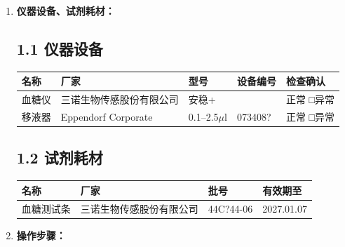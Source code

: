 \documentclass[UTF8,10pt,a4paper,fontset=fandol]{ctexart}
\newcommand{\fieldvalue}[1]{#1}
\newcommand{\handwritten}[1]{#1}
\begin{document}
\begin{enumerate}
\item \textbf{仪器设备、试剂耗材：}

\subsection*{1.1 \quad 仪器设备}

\begin{center}
\begin{tabular}{|p{}|p{}|p{}|p{}|p{}|}
\hline
名称 & 厂家 & 型号 & 设备编号 & 检查确认 \\
\hline
血糖仪 & 三诺生物传感股份有限公司 & 安稳+ & & 
\fieldvalue{\handwritten{\checkmark}}正常 \quad □异常 \\
\hline
移液器 & Eppendorf Corporate & 0.1--2.5$\mu$l &
\fieldvalue{\handwritten{073408?}} &
\fieldvalue{\handwritten{\checkmark}}正常 \quad □异常 \\
\hline
\end{tabular}
\end{center}

\subsection*{1.2 \quad 试剂耗材}

\begin{center}
\begin{tabular}{|p{}|p{}|p{}|p{}|}
\hline
名称 & 厂家 & 批号 & 有效期至 \\
\hline
血糖测试条 & 三诺生物传感股份有限公司 &
\fieldvalue{\handwritten{44C?44-06}} &
\fieldvalue{\handwritten{2027.01.07}} \\
\hline
\end{tabular}
\end{center}

\item \textbf{操作步骤：}


\end{enumerate}
\end{document}
